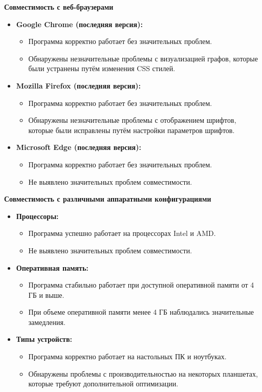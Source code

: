 \documentclass{article}
\begin{document}
    \textbf{Совместимость с веб-браузерами}

    \begin{itemize}
        \item \textbf{Google Chrome (последняя версия):}
        \begin{itemize}
            \item Программа корректно работает без значительных проблем.
            \item Обнаружены незначительные проблемы с визуализацией графов, которые были устранены путём изменения CSS стилей.
        \end{itemize}
        \item \textbf{Mozilla Firefox (последняя версия):}
        \begin{itemize}
            \item Программа корректно работает без значительных проблем.
            \item Обнаружены незначительные проблемы с отображением шрифтов, которые были исправлены путём настройки параметров шрифтов.
        \end{itemize}
        \item \textbf{Microsoft Edge (последняя версия):}
        \begin{itemize}
            \item Программа корректно работает без значительных проблем.
            \item Не выявлено значительных проблем совместимости.
        \end{itemize}
    \end{itemize}

    \textbf{Совместимость с различными аппаратными конфигурациями}

    \begin{itemize}
        \item \textbf{Процессоры:}
        \begin{itemize}
            \item Программа успешно работает на процессорах Intel и AMD.
            \item Не выявлено значительных проблем совместимости.
        \end{itemize}
        \item \textbf{Оперативная память:}
        \begin{itemize}
            \item Программа стабильно работает при доступной оперативной памяти от 4 ГБ и выше.
            \item При объеме оперативной памяти менее 4 ГБ наблюдались значительные замедления.
        \end{itemize}
        \item \textbf{Типы устройств:}
        \begin{itemize}
            \item Программа корректно работает на настольных ПК и ноутбуках.
            \item Обнаружены проблемы с производительностью на некоторых планшетах, которые требуют дополнительной оптимизации.
        \end{itemize}
    \end{itemize}
\end{document}
